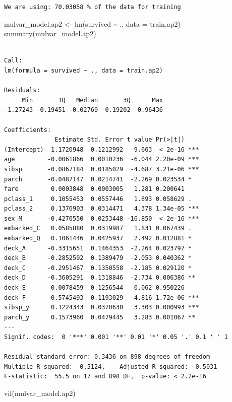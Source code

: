 \documentclass[
  letterpaper,
  DIV=11,
  numbers=noendperiod]{scrartcl}
\newenvironment{Shaded}{\begin{snugshade}}{\end{snugshade}}
\newcommand{\AttributeTok}[1]{\textcolor[rgb]{0.40,0.45,0.13}{#1}}
\newcommand{\FunctionTok}[1]{\textcolor[rgb]{0.28,0.35,0.67}{#1}}
\newcommand{\NormalTok}[1]{\textcolor[rgb]{0.00,0.23,0.31}{#1}}
\newcommand{\OtherTok}[1]{\textcolor[rgb]{0.00,0.23,0.31}{#1}}
\newcommand{\SpecialCharTok}[1]{\textcolor[rgb]{0.37,0.37,0.37}{#1}}
\begin{document}
\begin{verbatim}
We are using: 70.03058 % of the data for training
\end{verbatim}

\begin{Shaded}
\begin{Highlighting}[]
\NormalTok{mulvar\_model.ap2 }\OtherTok{\textless{}{-}} \FunctionTok{lm}\NormalTok{(survived }\SpecialCharTok{\textasciitilde{}}\NormalTok{ ., }\AttributeTok{data =}\NormalTok{ train.ap2)}
\FunctionTok{summary}\NormalTok{(mulvar\_model.ap2)}
\end{Highlighting}
\end{Shaded}

\begin{verbatim}

Call:
lm(formula = survived ~ ., data = train.ap2)

Residuals:
     Min       1Q   Median       3Q      Max 
-1.27243 -0.19451 -0.02769  0.19202  0.96436 

Coefficients:
              Estimate Std. Error t value Pr(>|t|)    
(Intercept)  1.1720948  0.1212992   9.663  < 2e-16 ***
age         -0.0061866  0.0010236  -6.044 2.20e-09 ***
sibsp       -0.0867184  0.0185029  -4.687 3.21e-06 ***
parch       -0.0487147  0.0214741  -2.269 0.023534 *  
fare         0.0003848  0.0003005   1.281 0.200641    
pclass_1     0.1055453  0.0557446   1.893 0.058629 .  
pclass_2     0.1376903  0.0314471   4.378 1.34e-05 ***
sex_M       -0.4270550  0.0253448 -16.850  < 2e-16 ***
embarked_C   0.0585880  0.0319987   1.831 0.067439 .  
embarked_Q   0.1061446  0.0425937   2.492 0.012881 *  
deck_A      -0.3315651  0.1464353  -2.264 0.023797 *  
deck_B      -0.2852592  0.1389479  -2.053 0.040362 *  
deck_C      -0.2951467  0.1350558  -2.185 0.029120 *  
deck_D      -0.3605291  0.1318846  -2.734 0.006386 ** 
deck_E       0.0078459  0.1256544   0.062 0.950226    
deck_F      -0.5745493  0.1193029  -4.816 1.72e-06 ***
sibsp_y      0.1224343  0.0370630   3.303 0.000993 ***
parch_y      0.1573960  0.0479445   3.283 0.001067 ** 
---
Signif. codes:  0 '***' 0.001 '**' 0.01 '*' 0.05 '.' 0.1 ' ' 1

Residual standard error: 0.3436 on 898 degrees of freedom
Multiple R-squared:  0.5124,    Adjusted R-squared:  0.5031 
F-statistic:  55.5 on 17 and 898 DF,  p-value: < 2.2e-16
\end{verbatim}

\begin{Shaded}
\begin{Highlighting}[]
\FunctionTok{vif}\NormalTok{(mulvar\_model.ap2)}
\end{Highlighting}
\end{Shaded}
\end{document}
